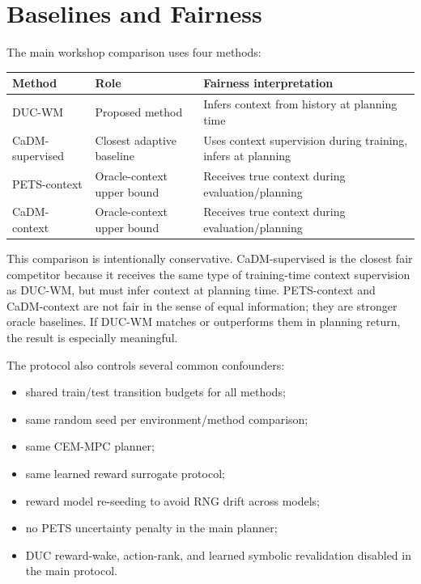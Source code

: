 \documentclass[11pt]{article}
\begin{document}
\section{Baselines and Fairness}

The main workshop comparison uses four methods:
\begin{center}
\begin{tabular}{lll}
\toprule
Method & Role & Fairness interpretation \\
\midrule
DUC-WM & Proposed method & Infers context from history at planning time \\
CaDM-supervised & Closest adaptive baseline & Uses context supervision during training, infers at planning \\
PETS-context & Oracle-context upper bound & Receives true context during evaluation/planning \\
CaDM-context & Oracle-context upper bound & Receives true context during evaluation/planning \\
\bottomrule
\end{tabular}
\end{center}

This comparison is intentionally conservative. CaDM-supervised is the closest fair competitor because it receives the same type of training-time context supervision as DUC-WM, but must infer context at planning time. PETS-context and CaDM-context are not fair in the sense of equal information; they are stronger oracle baselines. If DUC-WM matches or outperforms them in planning return, the result is especially meaningful.

The protocol also controls several common confounders:
\begin{itemize}[leftmargin=1.5em]
    \item shared train/test transition budgets for all methods;
    \item same random seed per environment/method comparison;
    \item same CEM-MPC planner;
    \item same learned reward surrogate protocol;
    \item reward model re-seeding to avoid RNG drift across models;
    \item no PETS uncertainty penalty in the main planner;
    \item DUC reward-wake, action-rank, and learned symbolic revalidation disabled in the main protocol.
\end{itemize}
\end{document}

